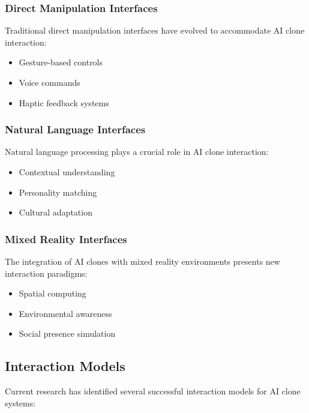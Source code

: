 \subsubsection{Direct Manipulation Interfaces}
Traditional direct manipulation interfaces have evolved to accommodate AI clone interaction:
\begin{itemize}
\item Gesture-based controls
\item Voice commands
\item Haptic feedback systems
\end{itemize}

\subsubsection{Natural Language Interfaces}
Natural language processing plays a crucial role in AI clone interaction:
\begin{itemize}
\item Contextual understanding
\item Personality matching
\item Cultural adaptation
\end{itemize}

\subsubsection{Mixed Reality Interfaces}
The integration of AI clones with mixed reality environments presents new interaction paradigms:
\begin{itemize}
\item Spatial computing
\item Environmental awareness
\item Social presence simulation
\end{itemize}

\subsection{Interaction Models}

Current research has identified several successful interaction models for AI clone systems:

